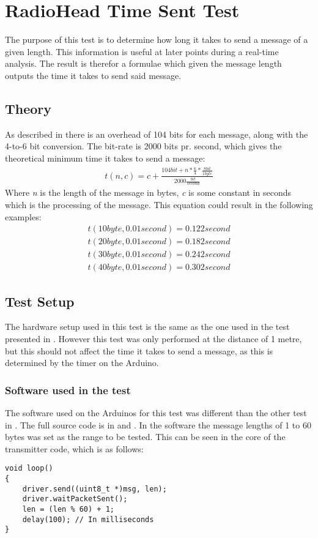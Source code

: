 \chapter{RadioHead Time Sent Test} %
\label{cha:radiohead_time_sent_test}
The purpose of this test is to determine how long it takes to send a message of a given length.
This information is useful at later points during a real-time analysis.
The result is therefor a formulae which given the message length outputs the time it takes to send said message. 

\section*{Theory}
As described in  there is an overhead of 104 bits for each message, along with the 4-to-6 bit conversion.
The bit-rate is 2000 bits pr. second, which gives the theoretical minimum time it takes to send a message:
\begin{align*}
t(n,c)=c+\frac { 104 bit+n*\frac { 6 }{ 4 } *\frac { 8 bit }{ 1 byte }  }{ 2000\frac { bit }{ second }  } 
\end{align*}
Where \textit{n} is the length of the message in bytes, \textit{c} is some constant in seconds which is the processing of the message. This equation could result in the following examples:
\begin{align*}
t(10 byte, 0.01 second) = 0.122 second\\
t(20 byte, 0.01 second) = 0.182 second\\
t(30 byte, 0.01 second) = 0.242 second\\
t(40 byte, 0.01 second) = 0.302 second
\end{align*}

\section*{Test Setup}
The hardware setup used in this test is the same as the one used in the test presented in .
However this test was only performed at the distance of 1 metre, but this should not affect the time it takes to send a message, as this is determined by the timer on the Arduino.

\subsection*{Software used in the test}
The software used on the Arduinos for this test was different than the other test in . 
The full source code is in  and .
In the software the message lengths of 1 to 60 bytes was set as the range to be tested. This can be seen in the core of the transmitter code, which is as follows:
\begin{lstlisting}[style=customc]
void loop()
{
    driver.send((uint8_t *)msg, len);
    driver.waitPacketSent();
    len = (len % 60) + 1;
    delay(100); // In milliseconds 
}
\end{lstlisting}

